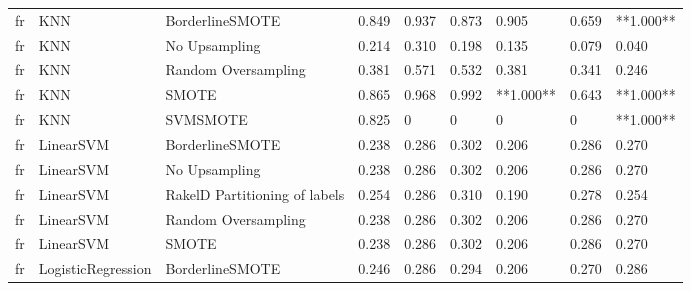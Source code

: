 \begin{tabular}{lllllllll}
      fr &                             KNN &               BorderlineSMOTE & 0.849 &                     0.937 &                 0.873 &                  0.905 &                                   0.659 & **1.000** \\
      fr &                             KNN &                 No Upsampling & 0.214 &                     0.310 &                 0.198 &                  0.135 &                                   0.079 &     0.040 \\
      fr &                             KNN &           Random Oversampling & 0.381 &                     0.571 &                 0.532 &                  0.381 &                                   0.341 &     0.246 \\
      fr &                             KNN &                         SMOTE & 0.865 &                     0.968 &                 0.992 &              **1.000** &                                   0.643 & **1.000** \\
      fr &                             KNN &                      SVMSMOTE & 0.825 &                         0 &                     0 &                      0 &                                       0 & **1.000** \\
      fr &                       LinearSVM &               BorderlineSMOTE & 0.238 &                     0.286 &                 0.302 &                  0.206 &                                   0.286 &     0.270 \\
      fr &                       LinearSVM &                 No Upsampling & 0.238 &                     0.286 &                 0.302 &                  0.206 &                                   0.286 &     0.270 \\
      fr &                       LinearSVM & RakelD Partitioning of labels & 0.254 &                     0.286 &                 0.310 &                  0.190 &                                   0.278 &     0.254 \\
      fr &                       LinearSVM &           Random Oversampling & 0.238 &                     0.286 &                 0.302 &                  0.206 &                                   0.286 &     0.270 \\
      fr &                       LinearSVM &                         SMOTE & 0.238 &                     0.286 &                 0.302 &                  0.206 &                                   0.286 &     0.270 \\
      fr &              LogisticRegression &               BorderlineSMOTE & 0.246 &                     0.286 &                 0.294 &                  0.206 &                                   0.270 &     0.286 \\

\end{tabular}
